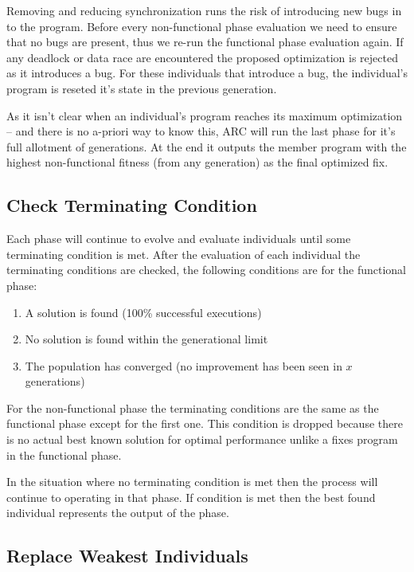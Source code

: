 \documentclass[10pt, conference, compsocconf]{IEEEtran}
\begin{document}
Removing and reducing synchronization runs the risk of introducing new bugs in
to the program. Before every non-functional phase evaluation we need to ensure
that no bugs are present, thus we re-run the functional phase evaluation again.
If any deadlock or data race are encountered the proposed optimization is
rejected as it introduces a bug.  For these individuals that introduce a bug,
the individual's program is reseted it's state in the previous generation.

As it isn't clear when an individual's program reaches its maximum optimization
-- and there is no a-priori way to know this, ARC will run the last phase for
it's full allotment of generations.  At the end it outputs the member program
with the highest non-functional fitness (from any generation) as the final
optimized fix.

\subsection{Check Terminating Condition}
\label{sec:check_terminating_condition}

Each phase will continue to evolve and evaluate individuals until some
terminating condition is met. After the evaluation of each individual the
terminating conditions are checked, the following conditions are for the
functional phase:

\begin{enumerate}
  \item A solution is found (100\% successful executions)
  \item No solution is found within the generational limit
  \item The population has converged (no improvement has been seen in $x$ generations)
\end{enumerate}

For the non-functional phase the terminating conditions are the same as the
functional phase except for the first one. This condition is dropped because
there is no actual best known solution for optimal performance unlike a fixes
program in the functional phase.

In the situation where no terminating condition is met then the process will
continue to operating in that phase. If condition is met then the best found
individual represents the output of the phase.

\subsection{Replace Weakest Individuals}
\label{sec:replace_weakest_individuals}
\end{document}
